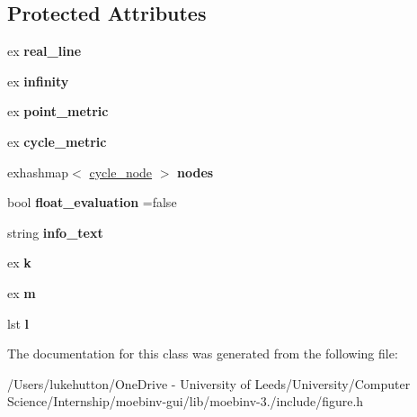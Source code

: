 \subsection*{Protected Attributes}
\begin{DoxyCompactItemize}
\item 
\mbox{\label{class_moeb_inv_1_1figure_aba3eaece2e5221edca5631b1a24e3bb1}} 
ex {\bfseries real\+\_\+line}
\item 
\mbox{\label{class_moeb_inv_1_1figure_a2bac895d87f790c9a2e137bba1a8b234}} 
ex {\bfseries infinity}
\item 
\mbox{\label{class_moeb_inv_1_1figure_acf90b212a1c28c2982759754d75b5b5f}} 
ex {\bfseries point\+\_\+metric}
\item 
\mbox{\label{class_moeb_inv_1_1figure_a3c3815eb39030137dbedcbd43d66cef5}} 
ex {\bfseries cycle\+\_\+metric}
\item 
\mbox{\label{class_moeb_inv_1_1figure_a97a66de49a1b3480321660f4b53e0962}} 
exhashmap$<$ \mbox{\hyperlink{class_moeb_inv_1_1cycle__node}{cycle\+\_\+node}} $>$ {\bfseries nodes}
\item 
\mbox{\label{class_moeb_inv_1_1figure_a004e8547d3d8cd091d7220c2641fa684}} 
bool {\bfseries float\+\_\+evaluation} =false
\item 
\mbox{\label{class_moeb_inv_1_1figure_a8f9ef2655ffa1e826426d0b29450da5c}} 
string {\bfseries info\+\_\+text}
\item 
\mbox{\label{class_moeb_inv_1_1figure_a069a8553a3d439c4b2a35a23b55c6ab0}} 
ex {\bfseries k}
\item 
\mbox{\label{class_moeb_inv_1_1figure_a23cad935b5579c07b151efce7598a760}} 
ex {\bfseries m}
\item 
\mbox{\label{class_moeb_inv_1_1figure_a41a8b6bdba7df3ad2a7ebd70202953b6}} 
lst {\bfseries l}
\end{DoxyCompactItemize}


The documentation for this class was generated from the following file\+:\begin{DoxyCompactItemize}
\item 
/\+Users/lukehutton/\+One\+Drive -\/ University of Leeds/\+University/\+Computer Science/\+Internship/moebinv-\/gui/lib/moebinv-\/3./include/figure.\+h\end{DoxyCompactItemize}
